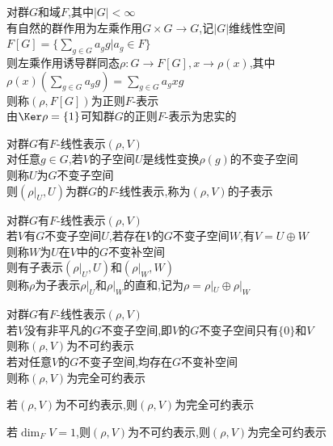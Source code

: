 \begin{dingyi}
对群$G$和域$F$,其中$|G|<\infty$\\
有自然的群作用为左乘作用$G\times G\to G$,记$|G|$维线性空间$F[G]=\{\sum\limits_{g\in G}a_{g}g|a_{g}\in F\}$\\
则左乘作用诱导群同态$\rho:G\to F[G],x\to \rho(x)$,其中$\rho(x)(\sum\limits_{g\in G}a_{g}g)=\sum\limits_{g\in G}a_{g}xg$\\
则称$(\rho,F[G])$为正则$F$-表示\\
由$\Ker \rho=\{1\}$可知群$G$的正则$F$-表示为忠实的
\end{dingyi}

\begin{dingyi}
对群$G$有$F$-线性表示$(\rho,V)$\\
对任意$g\in G$,若$V$的子空间$U$是线性变换$\rho(g)$的不变子空间\\
则称$U$为$G$不变子空间\\
则$(\rho|_{U},U)$为群$G$的$F$-线性表示,称为$(\rho,V)$的子表示
\end{dingyi}

\begin{dingyi}
对群$G$有$F$-线性表示$(\rho,V)$\\
若$V$有$G$不变子空间$U$,若存在$V$的$G$不变子空间$W$,有$V=U\oplus W$\\
则称$W$为$U$在$V$中的$G$不变补空间\\
则有子表示$(\rho|_{U},U)$和$(\rho|_{W},W)$\\
则称$\rho$为子表示$\rho|_{U}$和$\rho|_{W}$的直和,记为$\rho=\rho|_{U}\oplus\rho|_{W}$
\end{dingyi}

\begin{dingyi}
对群$G$有$F$-线性表示$(\rho,V)$\\
若$V$没有非平凡的$G$不变子空间,即$V$的$G$不变子空间只有$\{0\}$和$V$\\
则称$(\rho,V)$为不可约表示\\
若对任意$V$的$G$不变子空间,均存在$G$不变补空间\\
则称$(\rho,V)$为完全可约表示
\end{dingyi}

\begin{tuilun}
若$(\rho,V)$为不可约表示,则$(\rho,V)$为完全可约表示
\end{tuilun}

\begin{tuilun}
若$\dim_{F}V=1$,则$(\rho,V)$为不可约表示,则$(\rho,V)$为完全可约表示
\end{tuilun}

